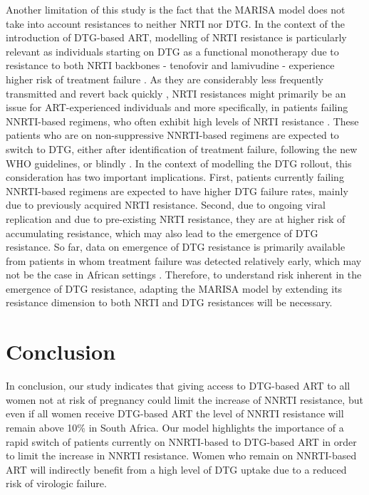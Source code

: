 \documentclass[10pt,letterpaper]{article}
\begin{document}
Another limitation of this study is the fact that the MARISA model does not take into account resistances to neither NRTI nor DTG. In the context of the introduction of DTG-based ART, modelling of NRTI resistance is particularly relevant as individuals starting on DTG as a functional monotherapy due to resistance to both NRTI backbones - tenofovir and lamivudine - experience higher risk of treatment failure \cite{Wandeler2019}. As they are considerably less frequently transmitted \cite{WHO2017} and revert back quickly \cite{rev,Kuhnert2018}, NRTI resistances might primarily be an issue for ART-experienced individuals and more specifically, in patients failing NNRTI-based regimens, who often exhibit high levels of NRTI resistance \cite{Steegen2017}. These patients who are on non-suppressive NNRTI-based regimens are expected to switch to DTG, either after identification of treatment failure, following the new WHO guidelines, or blindly \cite{Inzaule2019}. In the context of modelling the DTG rollout, this consideration has two important implications. First, patients currently failing NNRTI-based regimens are expected to have higher DTG failure rates, mainly due to previously acquired NRTI resistance. Second, due to ongoing viral replication and due to pre-existing NRTI resistance, they are at higher risk of accumulating resistance, which may also lead to the emergence of DTG resistance. So far, data on emergence of DTG resistance is primarily available from patients in whom treatment failure was detected relatively early, which may not be the case in African settings \cite{Venter2019}. Therefore, to understand risk inherent in the emergence of DTG resistance, adapting the MARISA model by extending its resistance dimension to both NRTI and DTG resistances will be necessary.

\section*{Conclusion}
In conclusion, our study indicates that giving access to DTG-based ART to all women not at risk of pregnancy could limit the increase of NNRTI resistance, but even if all women receive DTG-based ART the level of NNRTI resistance will remain above 10\% in South Africa. Our model highlights the importance of a rapid switch of patients currently on NNRTI-based to DTG-based ART in order to limit the increase in NNRTI resistance. Women who remain on NNRTI-based ART will indirectly benefit from a high level of DTG uptake due to a reduced risk of virologic failure. 
\end{document}
